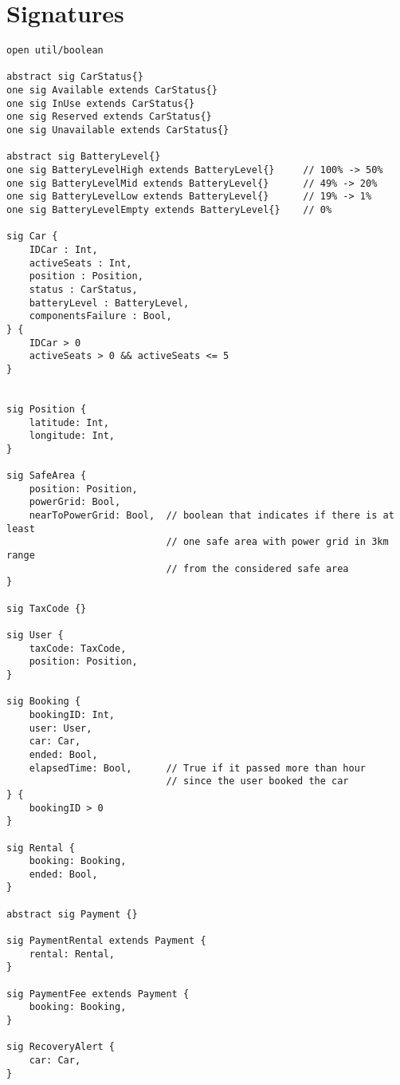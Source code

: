 \section{Signatures}

\lstset{language=alloy}

\begin{lstlisting}
open util/boolean

abstract sig CarStatus{}
one sig Available extends CarStatus{}
one sig InUse extends CarStatus{}
one sig Reserved extends CarStatus{}
one sig Unavailable extends CarStatus{}

abstract sig BatteryLevel{}
one sig BatteryLevelHigh extends BatteryLevel{}		// 100% -> 50%
one sig BatteryLevelMid extends BatteryLevel{}		// 49% -> 20%
one sig BatteryLevelLow extends BatteryLevel{}		// 19% -> 1%
one sig BatteryLevelEmpty extends BatteryLevel{}	// 0%

sig Car {
	IDCar : Int,
	activeSeats : Int,
	position : Position,
	status : CarStatus,
	batteryLevel : BatteryLevel,
	componentsFailure : Bool,
} {
	IDCar > 0
	activeSeats > 0 && activeSeats <= 5
}


sig Position {
	latitude: Int,
	longitude: Int,
}

sig SafeArea {
	position: Position,
	powerGrid: Bool,
	nearToPowerGrid: Bool,	// boolean that indicates if there is at least
							// one safe area with power grid in 3km range
							// from the considered safe area
}

sig TaxCode {}

sig User {
	taxCode: TaxCode,
	position: Position,
}

sig Booking {
	bookingID: Int,
	user: User,
	car: Car,
	ended: Bool,
	elapsedTime: Bool,		// True if it passed more than hour
							// since the user booked the car
} {
	bookingID > 0
}

sig Rental {
	booking: Booking,
	ended: Bool,
} 

abstract sig Payment {}

sig PaymentRental extends Payment {
	rental: Rental,
}

sig PaymentFee extends Payment {
	booking: Booking,
}

sig RecoveryAlert {
	car: Car,
}
\end{lstlisting}